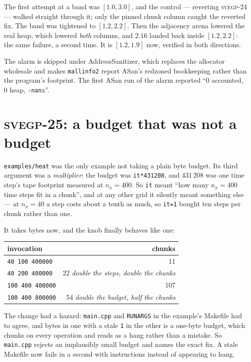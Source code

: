 \documentclass[11pt,a4paper]{report}
\newcommand{\svegp}[1]{\textsc{svegp-#1}}
\newcommand{\code}[1]{\texttt{#1}}
\begin{document}
The first attempt at a band was $[1.0,3.0]$, and the control --- reverting
\svegp{24} --- walked straight through it; only the pinned chunk column caught
the reverted fix. The band was tightened to $[1.2,2.2]$. Then the adjacency
arena lowered the real heap, which lowered \emph{both} columns, and $2.16$
landed back inside $[1.2,2.2]$: the same failure, a second time. It is
$[1.2,1.9]$ now, verified in both directions.

The alarm is skipped under AddressSanitizer, which replaces the allocator
wholesale and makes \code{mallinfo2} report ASan's redzoned bookkeeping rather
than the program's footprint. The first ASan run of the alarm reported
``0 accounted, 0 heap, \code{-nan}x''.

\section{\svegp{25}: a budget that was not a budget}

\code{examples/heat} was the only example not taking a plain byte budget. Its
third argument was a \emph{multiplier}: the budget was \code{it*431208}, and
431\,208 was one time step's tape footprint measured at $n_x=400$. So \code{it}
meant ``how many $n_x{=}400$ time steps fit in a chunk'', and at any other grid
it silently meant something else --- at $n_x=40$ a step costs about a tenth as
much, so \code{it=1} bought ten steps per chunk rather than one.

It takes bytes now, and the knob finally behaves like one:

\begin{center}
\begin{tabular}{@{}lr@{}}
\toprule
invocation & chunks \\
\midrule
\code{40 100 400000}  & 11 \\
\code{40 200 400000}  & 22 \hspace{1em}\emph{double the steps, double the chunks} \\
\code{100 400 400000} & 107 \\
\code{100 400 800000} & 54 \hspace{1em}\emph{double the budget, half the chunks} \\
\bottomrule
\end{tabular}
\end{center}

\noindent
The change had a hazard: \code{main.cpp} and \code{RUNARGS} in the example's
Makefile had to agree, and bytes in one with a stale \code{1} in the other is a
one-byte budget, which chunks on every operation and reads as a hang rather than
a mistake. So \code{main.cpp} rejects an implausibly small budget and names the
exact fix. A stale Makefile now fails in a second with instructions instead of
appearing to hang.
\end{document}
